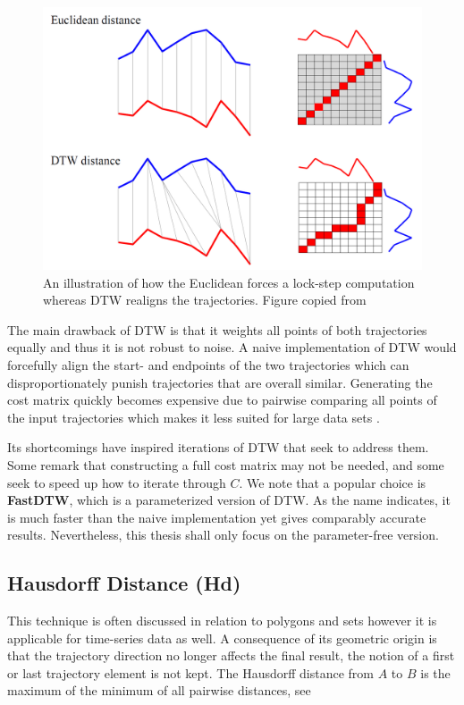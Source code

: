 \begin{figure}
\centering
\includegraphics[width=.7\textwidth]{figs/algos/ed_dtw_diff.png}
\caption{An illustration of how the Euclidean forces a lock-step computation whereas DTW realigns the trajectories. Figure copied from \cite{58-UCRTime}}
\label{fig:ed_dtw_diff}
\end{figure}


The main drawback of DTW is that it weights all points of both trajectories equally and thus it is not robust to noise. 
A naive implementation of DTW would forcefully align the start- and endpoints of the two trajectories which can disproportionately punish trajectories that are overall similar\cite{4-ElasticPartial}. 
Generating the cost matrix quickly becomes expensive due to pairwise comparing all points of the input trajectories which makes it less suited for large data sets \cite{27-DynamicTime}. 

Its shortcomings have inspired iterations of DTW that seek to address them. Some remark that constructing a full cost matrix may not be needed, and some seek to speed up how to iterate through $C$\cite{5-ComputingVisualizing}. We note that a popular choice is \textbf{FastDTW}, which is a parameterized version of DTW. 
As the name indicates, it is much faster than the naive implementation yet gives comparably accurate results\cite{9-FastDTWAccurate}. 
Nevertheless, this thesis shall only focus on the parameter-free version.



\subsection{Hausdorff Distance (Hd)}
This technique is often discussed in relation to polygons and sets\cite{49-HausdorffDistance} however it is applicable for time-series data as well. 
A consequence of its geometric origin is that the trajectory direction no longer affects the final result, the notion of a first or last trajectory element is not kept\cite{86-ComputingMinimum}. 
The Hausdorff distance from  $A$ to $B$ is the maximum of the minimum of all pairwise distances, see \cite{48-ComputationalGeometrya} 


